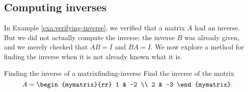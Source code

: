 \subsection{Computing inverses}

In Example \ref{exa:verifying-inverse}, we verified that a matrix $A$
had an inverse. But we did not actually compute the inverse: the
inverse $B$ was already given, and we merely checked that $AB=I$ and
$BA=I$. We now explore a method for finding the inverse when it is not
already known what it is.

\begin{example}{Finding the inverse of a matrix}{finding-inverse}
  Find the inverse of the matrix
  \begin{equation*}
    A=\begin{mymatrix}{rr}
      1 & -2 \\
      2 & -3
    \end{mymatrix}.
  \end{equation*}
\end{example}

